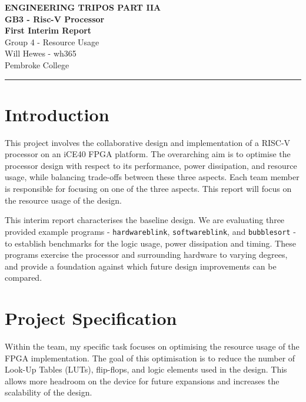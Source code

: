 \documentclass[a4paper,10pt]{article}
\renewcommand{\maketitle}{
    \begin{center}
        \LARGE \textbf{ENGINEERING TRIPOS PART IIA} \\ 
        \vspace{0.5em}
        \Large \textbf{GB3 - Risc-V Processor} \\ 
        \vspace{0.5em}
        \textbf{First Interim Report} \\
        \large Group 4 - Resource Usage \\
        \vspace{1em}
        \large Will Hewes - wh365 \\ 
        Pembroke College \\ 
        \vspace{0.5em}
    \end{center}
}
\begin{document}
\maketitle
\hrule
\tableofcontents
\newpage

\section{Introduction}
\label{sec:Introduction}

This project involves the collaborative design and implementation 
of a RISC-V processor on an iCE40 FPGA platform. 
The overarching aim is to optimise 
the processor design with respect to its 
performance, power dissipation, and resource usage, 
while balancing trade-offs between these three aspects. 
Each team member is responsible for focusing on one of the three aspects.
This report will focus on the resource usage of the design.

This interim report characterises the baseline design. 
We are evaluating three provided example programs - 
\texttt{hardwareblink}, \texttt{softwareblink}, and \texttt{bubblesort} - 
to establish benchmarks for the logic usage, power dissipation and timing. 
These programs exercise the processor and surrounding hardware to varying degrees, 
and provide a foundation against which future design improvements can be compared.


\section{Project Specification}
\label{sec:Project_Specification}

Within the team, my specific task focuses on 
optimising the resource usage of the FPGA implementation. 
The goal of this optimisation is to reduce the number of 
Look-Up Tables (LUTs), flip-flops, and logic elements used in the design. 
This allows more headroom on the device for future expansions 
and increases the scalability of the design.


\iffalse
LUTs, flip-flops, and routing wires are 
the fundamental building blocks of digital logic in an FPGA. 
A LUT is a configurable logic element that can implement 
arbitrary combinational logic functions 
by storing precomputed outputs for each possible input combination. 
Flip-flops are used to store single bits of state and 
are essential for implementing sequential logic, 
such as registers and control signals. 
Routing wires connect LUTs and flip-flops together, 
allowing signals to propagate through the design. 
The quantity and efficiency of these elements directly impact 
how much logic the FPGA can implement and how complex the system can be.
\fi
\end{document}
